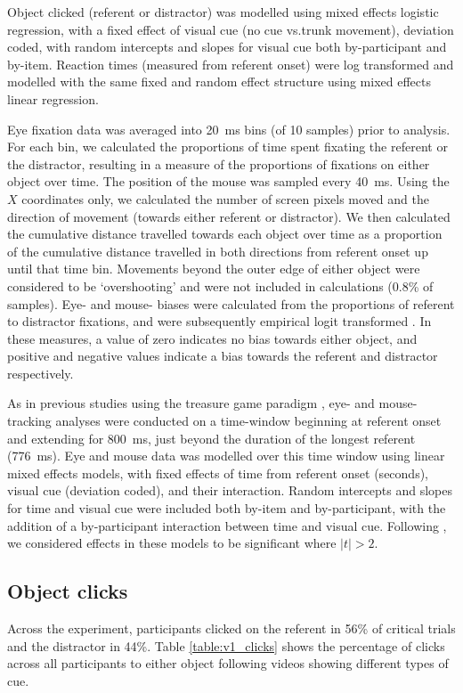 \documentclass[a4paper,man,natbib]{apa6}
\begin{document}
Object clicked (referent or distractor) was modelled using mixed effects logistic regression, with a fixed effect of visual cue (no cue vs.\@ trunk movement), deviation coded, with random intercepts and slopes for visual cue both by-participant and by-item.
Reaction times (measured from referent onset) were log transformed and modelled with the same fixed and random effect structure using mixed effects linear regression.

Eye fixation data was averaged into 20~ms bins (of 10 samples) prior to analysis.
For each bin, we calculated the proportions of time spent fixating the referent or the distractor, resulting in a measure of the proportions of fixations on either object over time.
The position of the mouse was sampled every 40~ms.
Using the $X$ coordinates only, we calculated the number of screen pixels moved and the direction of movement (towards either referent or distractor).
We then calculated the cumulative distance travelled towards each object over time as a proportion of the cumulative distance travelled in both directions from referent onset up until that time bin.
Movements beyond the outer edge of either object were considered to be `overshooting' and were not included in calculations (0.8\% of samples).
Eye- and mouse- biases were calculated from the proportions of referent to distractor fixations, and were subsequently empirical logit transformed \citep{Barr2008}. 
In these measures, a value of zero indicates no bias towards either object, and positive and negative values indicate a bias towards the referent and distractor respectively.

As in previous studies using the treasure game paradigm \citep{King2018,Loy2017}, eye- and mouse- tracking analyses were conducted on a time-window beginning at referent onset and extending for 800~ms, just beyond the duration of the longest referent (776~ms).
Eye and mouse data was modelled over this time window using linear mixed effects models, with fixed effects of time from referent onset (seconds), visual cue (deviation coded), and their interaction.
Random intercepts and slopes for time and visual cue were included both by-item and by-participant, with the addition of a by-participant interaction between time and visual cue.
Following \citet{Baayen2008}, we considered effects in these models to be significant where $|t|>2$.

\subsection{Object clicks}
Across the experiment, participants clicked on the referent in 56\% of critical trials and the distractor in 44\%.
Table \ref{table:v1_clicks} shows the percentage of clicks across all participants to either object following videos showing different types of cue.
\end{document}
